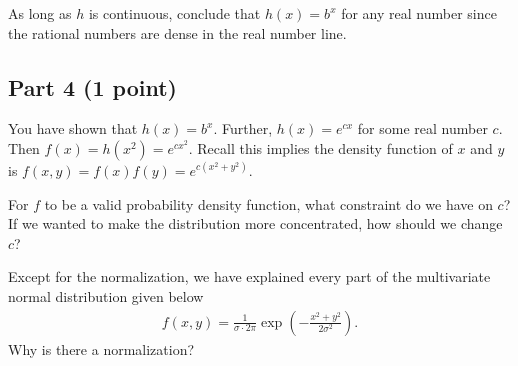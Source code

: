 \documentclass{article}
\begin{document}
As long as $h$ is continuous, conclude that $h(x) = b^x$ for any real number since the rational numbers are dense in the real number line.

\subsection*{Part 4 (1 point)}

You have shown that $h(x) = b^x$. Further, $h(x) = e^{cx}$ for some real number $c$.
Then $f(x) = h(x^2) = e^{c x^2}$.
Recall this implies the density function of $x$ and $y$ is $f(x,y) = f(x) f(y) = e^{c (x^2 + y^2)}$.

For $f$ to be a valid probability density function, what constraint do we have on $c$?
If we wanted to make the distribution more concentrated, how should we change $c$?

Except for the normalization, we have explained every part of the multivariate normal distribution given below
\begin{align*}
f(x,y) = \frac1{\sigma \cdot 2 \pi} \exp\left(-\frac{x^2 + y^2}{2\sigma^2}\right).
\end{align*}
Why is there a normalization?

%
\end{document}
